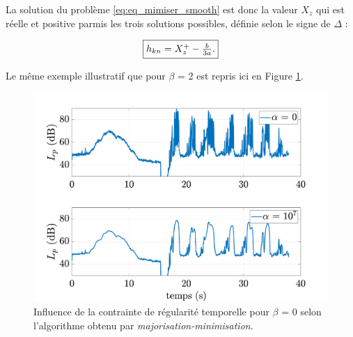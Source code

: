 La solution du problème \ref{eq:eq_mimiser_smooth} est donc la valeur $X_z$ qui est réelle et positive parmis les trois solutions possibles, définie selon le signe de $\Delta$ : 

\begin{equation}
\fbox{$
h_{kn} = X_{z}^+-\frac{b}{3a}.
$}
\end{equation}

Le même exemple illustratif que pour $\beta$ = 2 est repris ici en Figure \ref{fig:smooth_0}.

\begin{figure}[h]
\centering
\includegraphics[width=.9\linewidth]{./figures/NMF/LpSmooth_0.pdf}
\caption{Influence de la contrainte de régularité temporelle pour $\beta$ = 0 selon l'algorithme obtenu par \textit{majorisation-minimisation}.}
\label{fig:smooth_0}
\end{figure}
